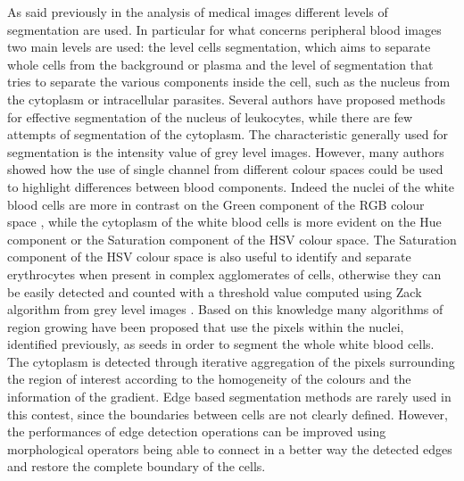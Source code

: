 \documentclass[final,a4paper,12pt,english]{UnicaPhdThesis3}
\begin{document}
As said previously in the analysis of medical images different levels of segmentation are used. In particular for what concerns peripheral blood images two main levels are used: the level cells segmentation, which aims to separate whole cells from the background or plasma and the level of segmentation that tries to separate the various components inside the cell, such as the nucleus from the cytoplasm or intracellular parasites. Several authors have proposed methods for effective segmentation of the nucleus of leukocytes, while there are few attempts of segmentation of the cytoplasm. The characteristic generally used for segmentation is the intensity value of grey level images. However, many authors showed how the use of single channel from different colour spaces could be used to highlight differences between blood components. Indeed the nuclei of the white blood cells are more in contrast on the Green component of the RGB colour space \cite{Cseke}, while the cytoplasm of the white blood cells is more evident on the Hue component \cite{Wu} or the Saturation component \cite{Halim} of the HSV colour space. The Saturation component of the HSV colour space is also useful to identify and separate erythrocytes \cite{DiR} when present in complex agglomerates of cells, otherwise they can be easily detected and counted with a threshold value computed using Zack algorithm from grey level images \cite{Berge}. Based on this knowledge many algorithms of region growing have been proposed \cite{Kovalev, Lez98, Lez02} that use the pixels within the nuclei, identified previously, as seeds in order to segment the whole white blood cells. The cytoplasm is detected through iterative aggregation of the pixels surrounding the region of interest according to the homogeneity of the colours and the information of the gradient. Edge based segmentation methods are rarely used in this contest, since the boundaries between cells are not clearly defined. However, the performances of edge detection operations can be improved using morphological operators \cite{Piuri, Sco05} being able to connect in a better way the detected edges and restore the complete boundary of the cells. 
\end{document}
